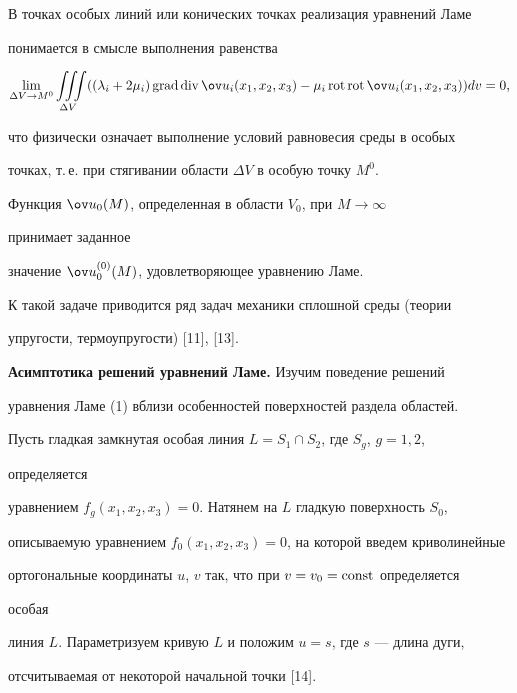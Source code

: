  


В точках особых линий или конических точках реализация уравнений Ламе  


понимается в смысле выполнения равенства  


\begin{equation} 


\lim_{\Delta V\to M^0}\iiint\limits_{\Delta V}((\lambda_i+2\mu_i) 


\Grad\Div\ov u_i(x_1,x_2,x_3)-\mu_i\Rot\Rot\ov u_i(x_1,x_2,x_3))dv=0, 


\end{equation} 


что физически означает выполнение условий равновесия среды в особых  


точках, т.\,е. при стягивании области $\Delta V$ в особую точку $M^0$. 


 


Функция $\ov u_0(M)$, определенная в области $V_0$, при $M\to\infty$ 


принимает заданное  


значение $\ov u{}^{(0)}_0(M)$, удовлетворяющее уравнению Ламе. 


 


К такой задаче приводится ряд задач механики сплошной среды (теории  


упругости, термоупругости) [11], [13]. 


\medskip 


 


{\bf Асимптотика решений уравнений Ламе.} Изучим поведение решений  


уравнения Ламе (1) вблизи особенностей поверхностей раздела областей. 


Пусть гладкая замкнутая особая линия $L=S_1\cap S_2$, где $S_g$, $g=1,2$, 


определяется  


уравнением $f_g(x_1,x_2,x_3)=0$. Натянем на $L$ гладкую поверхность $S_0$,  


описываемую уравнением $f_0(x_1,x_2,x_3)=0$, на которой введем криволинейные  


ортогональные координаты $u$, $v$ так, что при $v=v_0=\operatorname{const}$ определяется 


особая  


линия $L$. Параметризуем кривую $L$ и положим $u=s$, где $s$ --- длина дуги,  


отсчитываемая от некоторой начальной точки [14]. 



